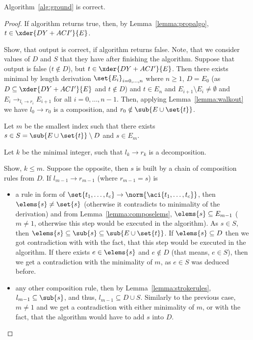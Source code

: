\begin{prop}
 Algorithm~\ref{alg:ground} is correct.
\begin{proof}
	If algorithm returns true, then, by Lemma~\ref{lemma:propalgo}, $t\in\xder{DY+ACI'}{E}$.
	
	Show, that output is correct, if algorithm returns false. Note, that we consider values of $D$ and $S$ that they have after finishing the algorithm. Suppose that output is false ($t\notin D$), but $t\in \xder{DY+ACI'}{E}$. Then there exists minimal by length derivation $\set{E_i}_{i=0,\dots,n}$ where $n\geq 1$, $D=E_0$ (as $D\subseteq \xder{DY+ACI'}{E}$ and $t\notin D$) and $t\in E_n$ and $E_{i+1}\setminus E_i \neq \emptyset$ and $E_i \rightarrow_{l_i\rightarrow r_i} E_{i+1}$ for all $i=0,\dots,n-1$.
	Then, applying Lemma~\ref{lemma:walkout} we have $l_0 \rightarrow r_0$ is a composition, and $r_0 \notin \sub{E\cup\set{t}}$.
	
	Let $m$ be the smallest index such that there exists $s \in S=\sub{E\cup\set{t}}\setminus D$ and $s\in E_m$.
	
	Let $k$ be the minimal integer, such that $l_k\rightarrow r_k$ is a decomposition.
	
	Show, $k\leq m$. Suppose the opposite, then $s$ is built by a chain of composition rules from $D$. If $l_{m-1}\rightarrow r_{m-1}$ (where $r_{m-1} =s $) is
	\begin{itemize}
	 \item a rule in form of  $ \set{t_1, \dots, t_c} \rightarrow \norm{\aci{t_1, \dots, t_c}}$, then $\elems{s} \neq \set{s}$ (otherwise it contradicts to minimality of the derivation) and from Lemma~\ref{lemma:composelems}, $\elems{s}\subseteq E_{m-1}$ ($m\neq 1$, otherwise this step would be executed in the algorithm). As $s\in S$, then $\elems{s}\subseteq \sub{s}\subseteq \sub{E\cup\set{t}}$.
	If $\elems{s}\subseteq D$ then we got contradiction with with the fact, that this step would be executed in the algorithm. If there exists $e\in\elems{s}$ and $e\notin D$ (that means, $e\in S$), then we get a contradiction with the minimality of $m$, as $e\in S$ was deduced before.
	 \item any other composition rule, then by Lemma~\ref{lemma:strokerules}, $l_{m-1} \subseteq \sub{s}$, and thus, $l_{m-1} \subseteq D\cup S$. Similarly to the previous case, $m\neq 1$ and we get a contradiction with either minimality of $m$, or with the fact, that the algorithm would have to add $s$ into $D$.\end{itemize}
      

\end{proof}
\end{prop}
